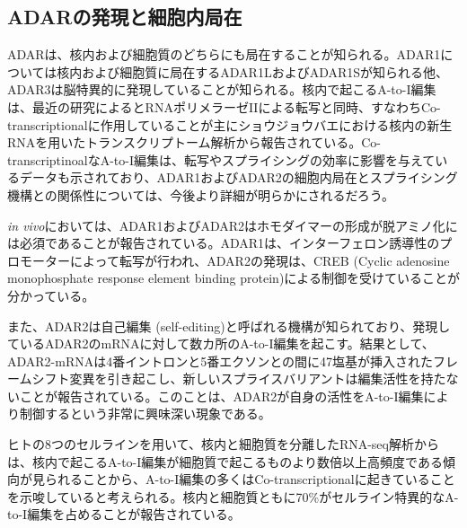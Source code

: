\subsection{ADARの発現と細胞内局在}
ADARは、核内および細胞質のどちらにも局在することが知られる。ADAR1については核内および細胞質に局在するADAR1LおよびADAR1Sが知られる他、ADAR3は脳特異的に発現していることが知られる。核内で起こるA-to-I編集は、最近の研究によるとRNAポリメラーゼIIによる転写と同時、すなわちCo-transcriptionalに作用していることが主にショウジョウバエにおける核内の新生RNAを用いたトランスクリプトーム解析から報告されている。Co-transcriptinoalなA-to-I編集は、転写やスプライシングの効率に影響を与えているデータも示されており、ADAR1およびADAR2の細胞内局在とスプライシング機構との関係性については、今後より詳細が明らかにされるだろう。
\par
\textit{in vivo}においては、ADAR1およびADAR2はホモダイマーの形成が脱アミノ化には必須であることが報告されている。ADAR1は、インターフェロン誘導性のプロモーターによって転写が行われ、ADAR2の発現は、CREB (Cyclic adenosine monophosphate response element binding protein)による制御を受けていることが分かっている。
\par
また、ADAR2は自己編集 (self-editing)と呼ばれる機構が知られており、発現しているADAR2のmRNAに対して数カ所のA-to-I編集を起こす。結果として、ADAR2-mRNAは4番イントロンと5番エクソンとの間に47塩基が挿入されたフレームシフト変異を引き起こし、新しいスプライスバリアントは編集活性を持たないことが報告されている。このことは、ADAR2が自身の活性をA-to-I編集により制御するという非常に興味深い現象である。
\par
ヒトの8つのセルラインを用いて、核内と細胞質を分離したRNA-seq解析からは、核内で起こるA-to-I編集が細胞質で起こるものより数倍以上高頻度である傾向が見られることから、A-to-I編集の多くはCo-transcriptionalに起きていることを示唆していると考えられる。核内と細胞質ともに70\%がセルライン特異的なA-to-I編集を占めることが報告されている。

